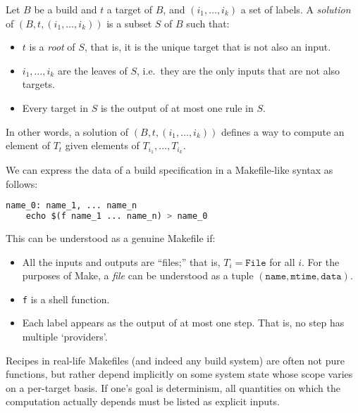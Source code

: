 \begin{definition}
  Let \(B\) be a build and \(t\) a target of \(B\), and \((i_1,\ldots,i_k)\) a set of labels. 
  A \emph{solution} of \((B,t,(i_1,\ldots,i_k))\) is a subset \(S\) of \(B\) such that:

  \begin{itemize}
  \item
    \(t\) is a \emph{root} of \(S\), that is, it is the unique target that is not also an input.
  \item
    \(i_1,\ldots,i_k\) are the leaves of \(S\), i.e.~they are the only inputs that are not also targets.
  \item
    Every target in \(S\) is the output of at most one rule in \(S\).
  \end{itemize}

\end{definition}

In other words, a solution of \((B,t,(i_1,\ldots,i_k))\) defines a way to compute an element of \(T_t\) given elements of \(T_{i_1},\ldots,T_{i_k}\).

\begin{example}
  We can express the data of a build specification in a Makefile-like syntax as follows:

  
\begin{lstlisting}[language=Python]
name_0: name_1, ... name_n
    echo $(f name_1 ... name_n) > name_0
\end{lstlisting}

This can be understood as a genuine Makefile if:

\begin{itemize}
\item
  All the inputs and outputs are ``files;'' that is, \(T_i=\mathtt{File}\) for all \(i\). 
  For the purposes of Make, a \emph{file} can be understood as a tuple \((\mathtt{name},\mathtt{mtime}, \mathtt{data})\).
\item
  \texttt{f} is a shell function.
\item
  Each label appears as the output of at most one step. That is, no step has multiple `providers'.
\end{itemize}

  Recipes in real-life Makefiles (and indeed any build system) are often not pure functions, but rather depend implicitly on some system state whose scope varies on a per-target basis. 
  If one's goal is determinism, all quantities on which the computation actually depends must be listed as explicit inputs.
\end{example}

